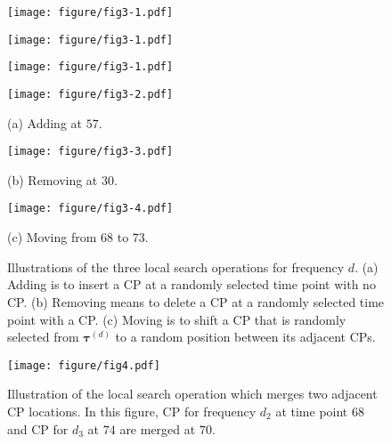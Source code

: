 \begin{figure}[t]
  \centering
  \begin{minipage}[t]{0.3\hsize}
      \centering
      \texttt{[image: figure/fig3-1.pdf]}
  \end{minipage}
  \hfill
  \begin{minipage}[t]{0.3\hsize}
    \centering
    \texttt{[image: figure/fig3-1.pdf]}
  \end{minipage}
  \hfill
  \begin{minipage}[t]{0.3\hsize}
    \centering
    \texttt{[image: figure/fig3-1.pdf]}
  \end{minipage}

  \begin{minipage}[t]{0.3\hsize}
      \centering
      \texttt{[image: figure/fig3-2.pdf]}
      \caption*{(a) Adding at $57$.}
  \end{minipage}
  \hfill
  \begin{minipage}[t]{0.3\hsize}
      \centering
      \texttt{[image: figure/fig3-3.pdf]}
      \caption*{(b) Removing at $30$.}
  \end{minipage}
  \hfill
  \begin{minipage}[t]{0.3\hsize}
      \centering
      \texttt{[image: figure/fig3-4.pdf]}
      \caption*{(c) Moving from $68$ to $73$.}
  \end{minipage}
  \caption{
  Illustrations of the three local search operations for frequency $d$.
  (a) Adding is to insert a CP at a randomly selected time point with no CP.
  (b) Removing means to delete a CP at a randomly selected time point with a CP.
  (c) Moving is to shift a CP that is randomly selected from $\bm{\tau}^{(d)}$ to a random position between its adjacent CPs.
  }
  \label{fig3}
\end{figure}

\begin{figure}[H]
 \centering
 \begin{minipage}[t]{0.6\hsize}
  \centering
  \texttt{[image: figure/fig4.pdf]}
 \end{minipage}
 \caption{
 Illustration of the local search operation which merges two adjacent CP locations.
 In this figure, CP for frequency $d_2$ at time point $68$ and CP for $d_3$ at $74$ are merged at $70$.
 }
 \label{fig4}
\end{figure}

